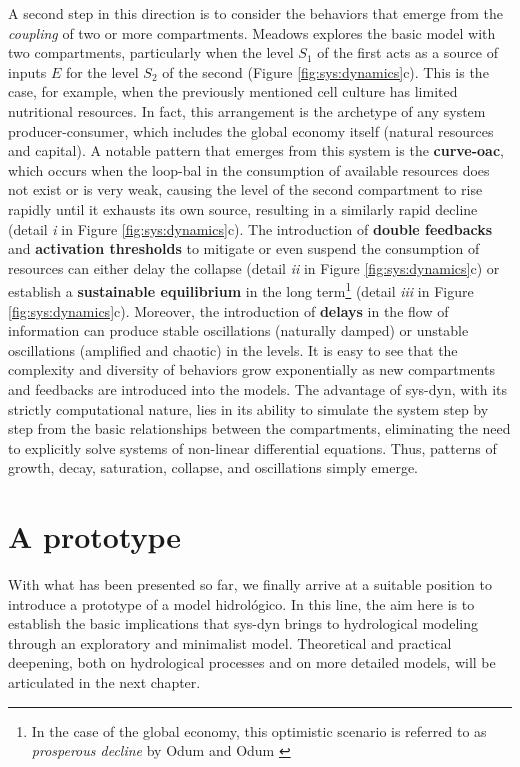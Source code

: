 \documentclass[./main_en.tex]{subfiles}
\begin{document}
\par A second step in this direction is to consider the behaviors that emerge from the \textit{coupling} of two or more compartments. Meadows explores the basic \gls{model} with two compartments, particularly when the level $S_1$ of the first acts as a source of inputs $E$ for the level $S_2$ of the second (Figure \ref{fig:sys:dynamics}c). This is the case, for example, when the previously mentioned cell culture has limited nutritional resources. In fact, this arrangement is the archetype of any \gls{system} producer-consumer, which includes the global economy itself (natural resources and capital). A notable pattern that emerges from this \gls{system} is the \textbf{\gls{curve-oac}}, which occurs when the \gls{loop-bal} in the consumption of available resources does not exist or is very weak, causing the level of the second compartment to rise rapidly until it exhausts its own source, resulting in a similarly rapid decline (detail \textrm{\textit{i}} in Figure \ref{fig:sys:dynamics}c). The introduction of \textbf{double feedbacks} and \textbf{activation thresholds} to mitigate or even suspend the consumption of resources can either delay the collapse (detail \textrm{\textit{ii}} in Figure \ref{fig:sys:dynamics}c) or establish a \textbf{sustainable equilibrium} in the long term\footnote{In the case of the global economy, this optimistic scenario is referred to as \textit{prosperous decline} by Odum and Odum \cite{odum2008}} (detail \textrm{\textit{iii}} in Figure \ref{fig:sys:dynamics}c). Moreover, the introduction of \textbf{delays} in the flow of information can produce stable oscillations (naturally damped) or unstable oscillations (amplified and chaotic) in the levels. It is easy to see that the complexity and diversity of behaviors grow exponentially as new compartments and feedbacks are introduced into the models. The advantage of \gls{sys-dyn}, with its strictly computational nature, lies in its ability to simulate the \gls{system} step by step from the basic relationships between the compartments, eliminating the need to explicitly solve systems of non-linear differential equations. Thus, patterns of growth, decay, saturation, collapse, and oscillations simply emerge.

\section{A prototype} \label{sec:systems:model}

\par With what has been presented so far, we finally arrive at a suitable position to introduce a prototype of a \gls{model} hidrológico. In this line, the aim here is to establish the basic implications that \gls{sys-dyn} brings to hydrological modeling through an exploratory and minimalist \gls{model}. Theoretical and practical deepening, both on hydrological processes and on more detailed models, will be articulated in the next chapter. 
\end{document}
